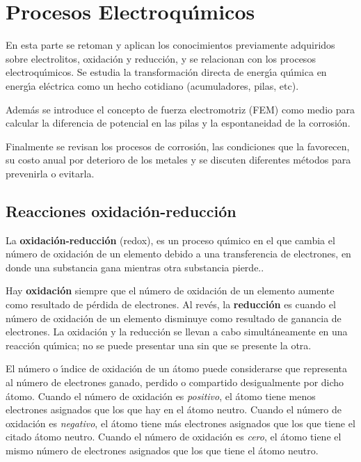 \chapter[Procesos electroquimicos]{Procesos Electroqu\'{\i}micos}
En esta parte se retoman y aplican los conocimientos previamente adquiridos sobre  electrolitos, oxidaci\'on y reducci\'on, y  se relacionan con los procesos electroqu\'{\i}micos.  Se  estudia la transformaci\'on directa de energ\'{\i}a qu\'{\i}mica en energ\'{\i}a
el\'ectrica como un hecho cotidiano (acumuladores, pilas, etc).

Adem\'as se introduce el concepto de fuerza electromotriz (\gls{FEM}) como medio para calcular la diferencia de potencial en las pilas y la espontaneidad de la corrosi\'on.

Finalmente se revisan los procesos de corrosi\'on, las condiciones que la favorecen, su
costo anual por deterioro de los metales y se discuten diferentes m\'etodos para prevenirla o evitarla.

\section{Reacciones oxidaci\'on-reducci\'on}
La \textbf{oxidaci\'on-reducci\'on} (redox), es un proceso  qu\'{\i}mico en el que cambia el n\'umero de oxidaci\'on de un elemento debido a una transferencia de electrones, en donde una substancia gana mientras otra substancia pierde..

Hay \textbf{oxidaci\'on} siempre que el n\'umero de  oxidaci\'on de un elemento aumente como resultado de p\'erdida de electrones. Al rev\'es, la \textbf{reducci\'on}  es cuando el n\'umero de oxidaci\'on de un elemento disminuye como resultado de ganancia de electrones. La oxidaci\'on y la reducci\'on se llevan a cabo simult\'aneamente en una reacci\'on qu\'{\i}mica; no se puede presentar una sin que se presente la otra.

El n\'umero o \'{\i}ndice de oxidaci\'on de un \'atomo puede considerarse que representa al n\'umero de electrones ganado, perdido o compartido desigualmente por dicho \'atomo. Cuando el n\'umero de oxidaci\'on es \textit{positivo}, el \'atomo tiene menos electrones asignados que los que hay en el \'atomo neutro. Cuando el n\'umero de oxidaci\'on es \textit{negativo}, el \'atomo tiene m\'as electrones asignados que los que tiene el citado \'atomo neutro. Cuando el n\'umero de oxidaci\'on  es \textit{cero}, el \'atomo tiene el mismo n\'umero de electrones asignados que los que tiene el \'atomo neutro.

